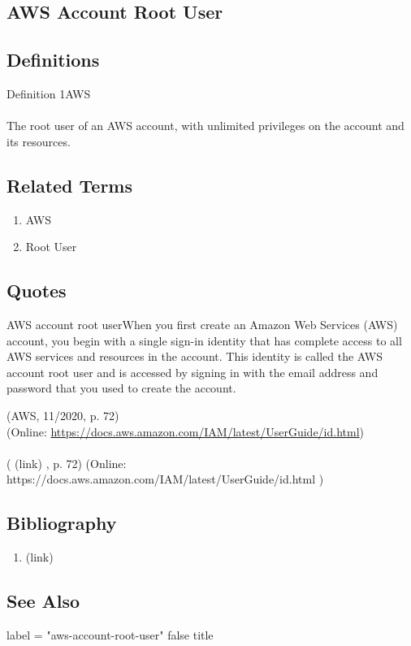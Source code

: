 \newpage \subsection*{AWS Account Root User } \subsection*{Definitions } \begin{DIC_Def}{Definition 1AWS }{} \paragraph{} The root user of an AWS account, with unlimited privileges on the account and its resources.  \end{DIC_Def} \subsection*{Related Terms } \begin{enumerate} \item  AWS  \item  Root User  \end{enumerate} \subsection*{Quotes } \begin{DIC_BlockQuote} AWS account root userWhen you first create an Amazon Web Services (AWS) account, you begin with a single sign-in identity that has complete access to all AWS services and resources in the account. This identity is called the AWS account root user and is accessed by signing in with the email address and password that you used to create the account.  \end{DIC_BlockQuote} (AWS, 11/2020, p. 72)\\ (Online: \url{https://docs.aws.amazon.com/IAM/latest/UserGuide/id.html})  \paragraph{} (  (link) \href{AWS, 11/2020 }{ } , p. 72)  (Online:  https://docs.aws.amazon.com/IAM/latest/UserGuide/id.html  )  \subsection*{Bibliography } \begin{enumerate} \item  (link) \href{AWS, 11/2020 }{ }   \end{enumerate} \subsection*{See Also } label = "aws-account-root-user"  false  title  